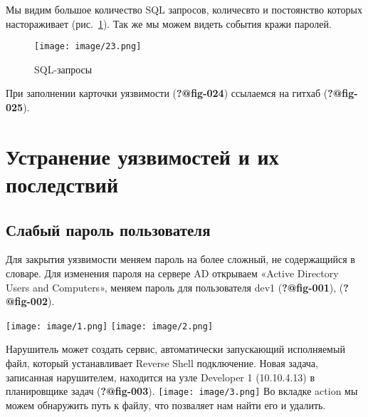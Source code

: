 \documentclass[
  12pt,
  a4paper,
  DIV=11,
  numbers=noendperiod]{scrreprt}
\begin{document}
Мы видим большое количество SQL запросов, количесвто и постоянство
которых настораживает (рис.~\ref{fig-023}). Так же мы можем видеть
события кражи паролей.

\begin{figure}

{\centering \texttt{[image: image/23.png]}

}

\caption{\label{fig-023}SQL-запросы}

\end{figure}

При заполнении карточки уязвимости (\textbf{?@fig-024}) ссылаемся на
гитхаб (\textbf{?@fig-025}).

\hypertarget{ux443ux441ux442ux440ux430ux43dux435ux43dux438ux435-ux443ux44fux437ux432ux438ux43cux43eux441ux442ux435ux439-ux438-ux438ux445-ux43fux43eux441ux43bux435ux434ux441ux442ux432ux438ux439}{%
\chapter{Устранение уязвимостей и их
последствий}\label{ux443ux441ux442ux440ux430ux43dux435ux43dux438ux435-ux443ux44fux437ux432ux438ux43cux43eux441ux442ux435ux439-ux438-ux438ux445-ux43fux43eux441ux43bux435ux434ux441ux442ux432ux438ux439}}

\hypertarget{ux441ux43bux430ux431ux44bux439-ux43fux430ux440ux43eux43bux44c-ux43fux43eux43bux44cux437ux43eux432ux430ux442ux435ux43bux44f}{%
\section{Слабый пароль
пользователя}\label{ux441ux43bux430ux431ux44bux439-ux43fux430ux440ux43eux43bux44c-ux43fux43eux43bux44cux437ux43eux432ux430ux442ux435ux43bux44f}}

Для закрытия уязвимости меняем пароль на более сложный, не содержащийся
в словаре. Для изменения пароля на сервере AD открываем «Active
Directory Users and Computers», меняем пароль для пользователя dev1
(\textbf{?@fig-001}), (\textbf{?@fig-002}).

\texttt{[image: image/1.png]}
\texttt{[image: image/2.png]}

Нарушитель может создать сервис, автоматически запускающий исполняемый
файл, который устанавливает Reverse Shell подключение. Новая задача,
записанная нарушителем, находится на узле Developer 1 (10.10.4.13) в
планировщике задач (\textbf{?@fig-003}).
\texttt{[image: image/3.png]} Во
вкладке action мы можем обнаружить путь к файлу, что позваляет нам найти
его и удалить.
\end{document}
